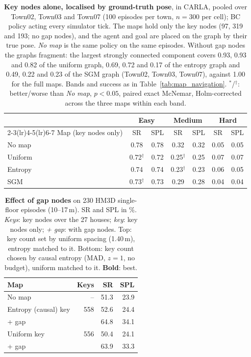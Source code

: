 \begin{table}[H]
\centering
\footnotesize
\setlength{\tabcolsep}{3.5pt}
\caption{\textbf{Key nodes alone, localised by ground-truth pose}, in CARLA, pooled over Town02, Town03 and Town07 (100 episodes per town, $n{=}300$ per cell); BC policy acting every simulator tick. The maps hold only the key nodes (97, 319 and 193; no gap nodes), and the agent and goal are placed on the graph by their true pose. \emph{No map} is the same policy on the same episodes. Without gap nodes the graphs fragment: the largest strongly connected component covers 0.93, 0.93 and 0.82 of the uniform graph, 0.69, 0.72 and 0.17 of the entropy graph and 0.49, 0.22 and 0.23 of the SGM graph (Town02, Town03, Town07), against 1.00 for the full maps. Bands and success as in Table~\ref{tab:map_navigation}. $^{*}$/$^{\dagger}$: better/worse than \emph{No map}, $p<0.05$, paired exact McNemar, Holm-corrected across the three maps within each band.}
\label{tab:map_navigation_pose}
\begin{tabular}{lcccccc}
\toprule
 & \multicolumn{2}{c}{Easy} & \multicolumn{2}{c}{Medium} & \multicolumn{2}{c}{Hard} \\
\cmidrule(lr){2-3}\cmidrule(lr){4-5}\cmidrule(lr){6-7}
Map (key nodes only) & SR & SPL & SR & SPL & SR & SPL \\
\midrule
No map & 0.78 & 0.78 & 0.32 & 0.32 & 0.05 & 0.05 \\
\midrule
Uniform & 0.72$^{\dagger}$ & 0.72 & 0.25$^{\dagger}$ & 0.25 & 0.07 & 0.07 \\
Entropy & 0.74 & 0.74 & 0.23$^{\dagger}$ & 0.23 & 0.06 & 0.05 \\
SGM & 0.73$^{\dagger}$ & 0.73 & 0.29 & 0.28 & 0.04 & 0.04 \\
\bottomrule
\end{tabular}
\end{table}

\begin{table}[H]
\centering
\scriptsize
\setlength{\tabcolsep}{2pt}
\caption{\textbf{Effect of gap nodes} on 230 HM3D single-floor episodes (10--17\,m). SR and SPL in \%. \emph{Keys}: key nodes over the 27 houses; \emph{key}: key nodes only; \emph{+ gap}: with gap nodes. Top: key count set by uniform spacing (1.40\,m), entropy matched to it. Bottom: key count chosen by causal entropy (MAD, $z{=}1$, no budget), uniform matched to it. \textbf{Bold}: best.}
\label{tab:gap_nodes}
\begin{tabular}{@{}lrrr@{}}
\toprule
Map & Keys & SR & SPL \\
\midrule
No map                     & --    & 51.3 & 23.9 \\
Entropy (causal) key       & 558     & 52.6 & 24.4 \\
\quad + gap                &         & 64.8 & 34.1 \\
Uniform key                & 556     & 50.4 & 24.1 \\
\quad + gap                &         & 63.9 & 33.3 \\
\bottomrule
\end{tabular}
\end{table}

